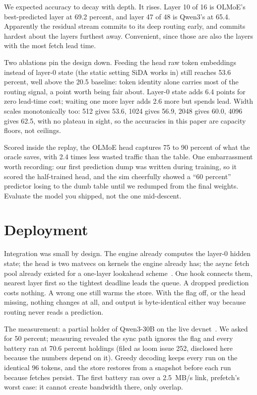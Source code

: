 \documentclass[11pt]{article}
\begin{document}
We expected accuracy to decay with depth. It rises. Layer 10 of 16 is OLMoE's best-predicted layer at 69.2 percent, and layer 47 of 48 is Qwen3's at 65.4. Apparently the residual stream commits to its deep routing early, and commits hardest about the layers furthest away. Convenient, since those are also the layers with the most fetch lead time.

Two ablations pin the design down. Feeding the head raw token embeddings instead of layer-0 state (the static setting SiDA works in) still reaches 53.6 percent, well above the 20.5 baseline: token identity alone carries most of the routing signal, a point worth being fair about. Layer-0 state adds 6.4 points for zero lead-time cost; waiting one more layer adds 2.6 more but spends lead. Width scales monotonically too: 512 gives 53.6, 1024 gives 56.9, 2048 gives 60.0, 4096 gives 62.5, with no plateau in sight, so the accuracies in this paper are capacity floors, not ceilings.

Scored inside the replay, the OLMoE head captures 75 to 90 percent of what the oracle saves, with 2.4 times less wasted traffic than the table. One embarrassment worth recording: our first prediction dump was written during training, so it scored the half-trained head, and the sim cheerfully showed a ``60 percent'' predictor losing to the dumb table until we redumped from the final weights. Evaluate the model you shipped, not the one mid-descent.

\section{Deployment}
Integration was small by design. The engine already computes the layer-0 hidden state; the head is two matvecs on kernels the engine already has; the async fetch pool already existed for a one-layer lookahead scheme~\citep{colibri}. One hook connects them, nearest layer first so the tightest deadline leads the queue. A dropped prediction costs nothing. A wrong one still warms the store. With the flag off, or the head missing, nothing changes at all, and output is byte-identical either way because routing never reads a prediction.

The measurement: a partial holder of Qwen3-30B on the live devnet~\citep{loom}. We asked for 50 percent; measuring revealed the sync path ignores the flag and every battery ran at 70.6 percent holdings (filed as loom issue 252, disclosed here because the numbers depend on it). Greedy decoding keeps every run on the identical 96 tokens, and the store restores from a snapshot before each run because fetches persist. The first battery ran over a 2.5~MB/s link, prefetch's worst case: it cannot create bandwidth there, only overlap.
\end{document}
